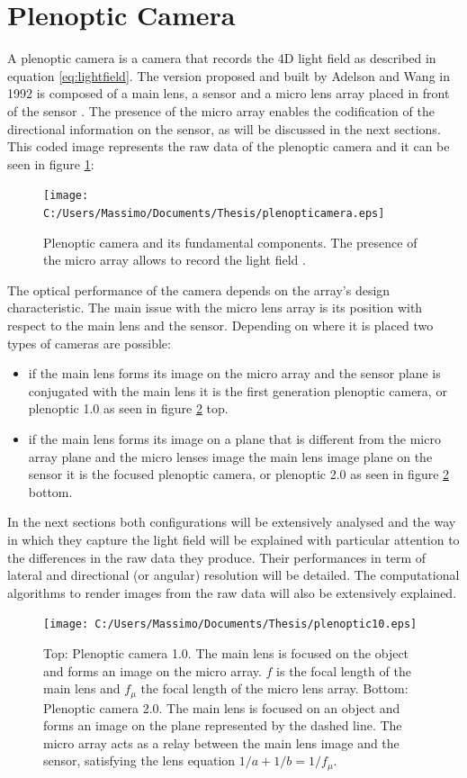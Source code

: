 \section{Plenoptic Camera}
\label{sec:plenoticcamera}
A plenoptic camera is a camera that records the 4D light field as described in equation \ref{eq:lightfield}. The version proposed and built by Adelson and Wang in 1992 \cite{adelson1992single} is composed of a main lens, a sensor and a micro lens array placed in front of the sensor \cite{adelson1992single}. The presence of the micro array enables the codification of the directional information on the sensor, as will be discussed in the next sections. This coded image represents the raw data of the plenoptic camera and it can be seen in figure \ref{fig:plenoptic1}: 
\begin{figure}[H]
	\centering
	\texttt{[image: C:/Users/Massimo/Documents/Thesis/plenopticamera.eps]}
	\caption{\label{fig:plenoptic1} Plenoptic camera and its fundamental components. The presence of the micro array allows to record the light field .}
\end{figure}
The optical performance of the camera depends on the array's design characteristic. The main issue with the micro lens array is its position with respect to the main lens and the sensor. Depending on where it is placed two types of cameras are possible:
\begin{itemize}
	\item if the main lens forms its image on the micro array and the sensor plane is conjugated with the main lens it is the first generation plenoptic camera, or plenoptic 1.0 \cite{ng2005light} as seen in figure \ref{fig:plenoptic2} top.
	\item if the main lens forms its image on a plane that is different from the micro array plane and the micro lenses image the main lens image plane on the sensor it is the focused plenoptic camera, or plenoptic 2.0 \cite{georgiev2010focused} as seen in figure \ref{fig:plenoptic2} bottom.
\end{itemize}
 In the next sections both configurations will be extensively analysed and the way in which they capture the light field will be explained with particular attention to the differences in the raw data they produce. Their performances in term of lateral and directional (or angular) resolution will be detailed. The computational algorithms to render images from the raw data will also be extensively explained.
\begin{figure}[H]
	\centering
	\texttt{[image: C:/Users/Massimo/Documents/Thesis/plenoptic10.eps]}
	\caption{\label{fig:plenoptic2}Top: Plenoptic camera 1.0. The main lens is focused on the object and forms an image on the micro array. $f$ is the focal length of the main lens and $f_\mu$ the focal length of the micro lens array. Bottom: Plenoptic camera 2.0. The main lens is focused on an object and forms an image on the plane represented by the dashed line. The micro array acts as a relay between the main lens image and the sensor, satisfying the lens equation $1/a+1/b=1/f_\mu$.}
\end{figure}
